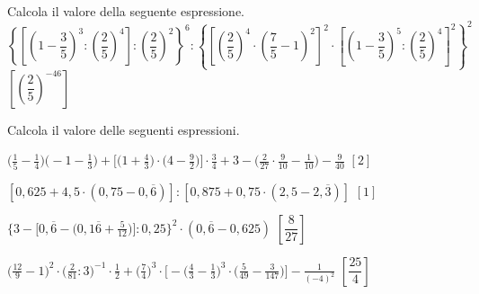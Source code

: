 
\begin{esercizio}[\Ast]
\label{ese:3.154}
Calcola il valore della seguente espressione.
\(
\left\{\left[\left(1-\dfrac{3}{5}\right)^3:\left(\dfrac{2}{5}\right)^{4}\right]:
 \left(\dfrac{2}{5}\right)^{2} \right\}^{6}
:\left\{\left[\left(\dfrac{2}{5}\right)^{4}\cdot\left(\dfrac{7}{5}-
1\right)^2\right]^{2}\cdot%
\left[\left(1-\dfrac{3}{5}\right)^{5}:\left(\dfrac{2}{5}\right)^{4}
\right]^{2}\right\}^{2}
\)
  \hfill \(\left[\left(\dfrac{2}{5} \right)^{-46} \right]\)
\end{esercizio}


\begin{esercizio}[\Ast]
\label{ese:3.155}
 Calcola il valore delle seguenti espressioni.
\begin{enumeratea}
\spazielenx
\item \(\displaystyle{\bigg(\frac{1}{5}-\frac{1}{4}\bigg)\bigg(-1-
\frac{1}{3}\bigg)+\bigg[\bigg(1+\frac{4}{3}\bigg)\cdot
\bigg(4-\frac{9}{2}\bigg)\bigg]\cdot{\frac{3}{4}}+3-\bigg(\frac{2}{27}
\cdot{\frac{9}{10}}-\frac{1}{10}\bigg)-\frac{9}{40}}\)
  \hfill \(\left[2 \right]\)
\item \(\displaystyle{\left[0,625+4,5\cdot(0,75-0,\overline{6})\right]:
\left[0,875+0,75\cdot(2,5-2,\overline{3})\right]}\)
  \hfill \(\left[1 \right]\)
\item \(\displaystyle{\bigg\{3-\bigg[0,\overline{6}-\bigg(0,1\overline{6}+
\frac{5}{12}\bigg)\bigg]:0,25\bigg\}^{2}\cdot
(0,\overline{6}-0,625)}\)
  \hfill \(\left[\dfrac{8}{27} \right]\)
\item \(\displaystyle{\bigg(\frac{12}{9}-1\bigg)^{2}\cdot\bigg(\frac{2}{81}:3
\bigg)^{-1}\cdot\frac{1}{2}+\bigg(\frac{7}{4}\bigg)^{3}\cdot
\bigg[-\bigg(\frac{4}{3}-\frac{1}{3}\bigg)^{3}\cdot\bigg(\frac{5}{49}-
\frac{3}{147}\bigg)\bigg]-\frac{1}{(-4)^{2}}}\)
  \hfill \(\left[\dfrac{25}{4} \right]\)
\end{enumeratea}
\end{esercizio}

